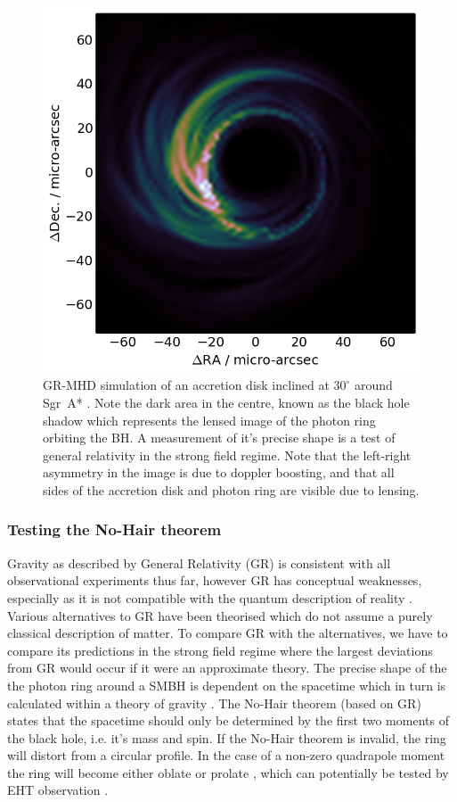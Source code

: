 \begin{figure}
\begin{center}
\includegraphics[width=0.5\columnwidth]{Images/disk30}
\caption{GR-MHD simulation of an accretion disk inclined at $30^\circ$ around Sgr~A* \citep{Moscibrodzka_2014}. Note the dark area in the centre, known as the black hole shadow which represents the lensed image of the photon ring orbiting the BH. A measurement of it's precise shape is a test of general relativity in the strong field regime. Note that the left-right asymmetry in the image is due to doppler boosting, and that all sides of the accretion disk and photon ring are visible due to lensing. \label{fig:grmhd}%
}
\end{center}

\end{figure}
\subsubsection{Testing the No-Hair theorem}

Gravity as described by General Relativity (GR) is consistent with all observational experiments thus far, however GR has conceptual weaknesses, especially as it is not compatible with the quantum description of reality \citep[e.g.][]{Goddi_2016}. Various alternatives to GR have been theorised which do not assume a purely classical description of matter. To compare GR with the alternatives, we have to compare its predictions in the strong field regime where the largest deviations from GR would occur if it were an approximate theory.
The precise shape of the the photon ring around a SMBH is dependent on the spacetime which in turn is calculated within a theory of gravity \citep{Takahashi_2004}. The No-Hair theorem (based on GR) states that the spacetime should only be determined by the first two moments of the black hole, i.e. it's mass and spin. If the No-Hair theorem is invalid, the ring will distort from a circular profile. In the case of a non-zero quadrapole moment the ring will become either oblate or prolate \citep{Johannsen_2010}, which can potentially be tested by EHT observation \citep{Broderick_2014}.


